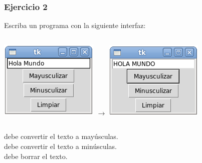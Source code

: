 \documentclass[12pt]{beamer}
\begin{document}
  \begin{frame}
    \label{ejercicio-transformar-texto}
    \frametitle{Ejercicio 2}
    Escriba un programa con la siguiente interfaz: \\
    \vfill

    \begin{columns}
        \includegraphics[width=\textwidth]{programas/tkinter/capturas/07-0.png}
        \(\longrightarrow\)
        \includegraphics[width=\textwidth]{programas/tkinter/capturas/07-1.png}
    \end{columns}

   \vfill
    debe convertir el texto a mayúsculas. \\
    debe convertir el texto a minúsculas. \\
    debe borrar el texto.
  \end{frame}
\end{document}
